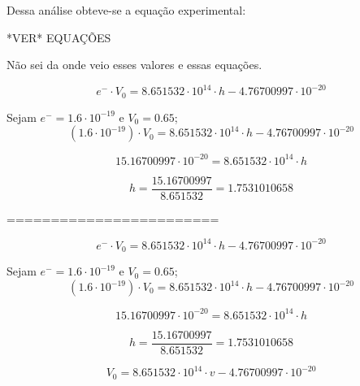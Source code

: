 \documentclass[10pt,twocolumn,letterpaper]{article}
\begin{document}
\noindent Dessa análise obteve-se a equação experimental:

{\Huge \color{red} *VER* EQUAÇÕES}

{\color{red} Não sei da onde veio esses valores e essas equações.}

\vspace{12cm}

{
    \color{red}

\begin{equation*}
    e^-\cdot V_0 = 8.651532\cdot 10^{14} \cdot h - 4.76700997 \cdot 10^{-20}
\end{equation*}

Sejam $ e^- = 1.6\cdot10^{-19}$ e $V_0 = 0.65$;
\begin{equation*}
    (1.6\cdot10^{-19})\cdot V_0 = 8.651532\cdot 10^{14} \cdot h - 4.76700997 \cdot 10^{-20}
\end{equation*}

\begin{equation*}
    15.16700997 \cdot 10^{-20} = 8.651532\cdot 10^{14} \cdot h
\end{equation*}

\begin{equation*}
    h = \frac{15.16700997}{8.651532} = 1.7531010658
\end{equation*}

}

========================

{
    \color{red}

\begin{equation*}
    e^-\cdot V_0 = 8.651532\cdot 10^{14} \cdot h - 4.76700997 \cdot 10^{-20}
\end{equation*}

Sejam $ e^- = 1.6\cdot10^{-19}$ e $V_0 = 0.65$;
\begin{equation*}
    (1.6\cdot10^{-19})\cdot V_0 = 8.651532\cdot 10^{14} \cdot h - 4.76700997 \cdot 10^{-20}
\end{equation*}

\begin{equation*}
    15.16700997 \cdot 10^{-20} = 8.651532\cdot 10^{14} \cdot h
\end{equation*}

\begin{equation*}
    h = \frac{15.16700997}{8.651532} = 1.7531010658
\end{equation*}

}

\begin{equation*}
    V_0 = 8.651532\cdot 10^{14} \cdot v - 4.76700997 \cdot 10^{-20}
\end{equation*}
\end{document}
